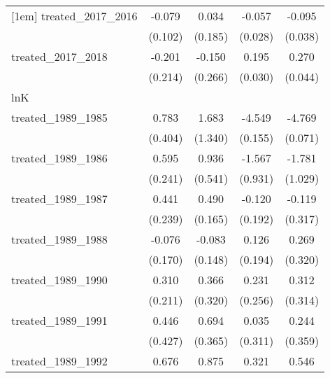 {\begin{tabular}{l*{4}{c}}
[1em]
treated\_2017\_2016&      -0.079         &       0.034         &      -0.057\sym{*}  &      -0.095\sym{*}  \\
            &     (0.102)         &     (0.185)         &     (0.028)         &     (0.038)         \\
[1em]
treated\_2017\_2018&      -0.201         &      -0.150         &       0.195\sym{***}&       0.270\sym{***}\\
            &     (0.214)         &     (0.266)         &     (0.030)         &     (0.044)         \\
\hline
lnK         &                     &                     &                     &                     \\
treated\_1989\_1985&       0.783         &       1.683         &      -4.549\sym{***}&      -4.769\sym{***}\\
            &     (0.404)         &     (1.340)         &     (0.155)         &     (0.071)         \\
[1em]
treated\_1989\_1986&       0.595\sym{*}  &       0.936         &      -1.567         &      -1.781         \\
            &     (0.241)         &     (0.541)         &     (0.931)         &     (1.029)         \\
[1em]
treated\_1989\_1987&       0.441         &       0.490\sym{**} &      -0.120         &      -0.119         \\
            &     (0.239)         &     (0.165)         &     (0.192)         &     (0.317)         \\
[1em]
treated\_1989\_1988&      -0.076         &      -0.083         &       0.126         &       0.269         \\
            &     (0.170)         &     (0.148)         &     (0.194)         &     (0.320)         \\
[1em]
treated\_1989\_1990&       0.310         &       0.366         &       0.231         &       0.312         \\
            &     (0.211)         &     (0.320)         &     (0.256)         &     (0.314)         \\
[1em]
treated\_1989\_1991&       0.446         &       0.694         &       0.035         &       0.244         \\
            &     (0.427)         &     (0.365)         &     (0.311)         &     (0.359)         \\
[1em]
treated\_1989\_1992&       0.676         &       0.875         &       0.321         &       0.546         \\

\end{tabular}}

